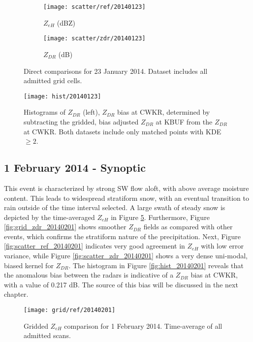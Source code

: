 \begin{figure}[H]
\centering
   \begin{subfigure}{0.49\linewidth} \centering
     \texttt{[image: scatter/ref/20140123]}
     \caption{$Z_{eH}$ (dBZ)}\label{fig:scatter_ref_20140123}
   \end{subfigure}
   \begin{subfigure}{0.49\linewidth} \centering
     \texttt{[image: scatter/zdr/20140123]}
     \caption{$Z_{DR}$ (dB)}\label{fig:scatter_zdr_20140123}
   \end{subfigure}
\caption{Direct comparisons for 23 January 2014. Dataset includes all admitted grid cells.}
\label{fig:scatter_20140123}
\end{figure}

\begin{figure}[H]
\texttt{[image: hist/20140123]}\centering
\caption{Histograms of $Z_{DR}$ (left), $Z_{DR}$ bias at CWKR, determined by subtracting the
gridded, bias adjusted $Z_{DR}$ at KBUF from the $Z_{DR}$ at CWKR. Both datasets include only
matched points with KDE $\geq 2$. } 
\label{fig:hist_20140123}
\end{figure}

\subsection{1 February 2014 - Synoptic}
This event is characterized by strong SW flow aloft, with above average moisture content. This leads to
widespread stratiform snow, with an eventual transition to rain outside of the time interval selected.
A large swath of steady snow is depicted by the time-averaged $Z_{eH}$ in Figure \ref{fig:grid_ref_20140201}. 
Furthermore, Figure \ref{fig:grid_zdr_20140201} shows smoother $Z_{DR}$
fields as compared with other events, which confirms the stratiform nature of the precipitation. Next, Figure \ref{fig:scatter_ref_20140201} indicates very
good agreement in $Z_{eH}$ with low error variance, while Figure \ref{fig:scatter_zdr_20140201} shows a very dense uni-modal, biased kernel for $Z_{DR}$. The
histogram in Figure \ref{fig:hist_20140201} reveals that the anomalous bias between the radars is indicative of a $Z_{DR}$ bias at CWKR, with a value of
0.217 dB. The source of this bias will be discussed in the next chapter.

\begin{figure}[H]
\texttt{[image: grid/ref/20140201]}
\caption{Gridded $Z_{eH}$ comparison for 1 February 2014. Time-average of all admitted scans.} 
\label{fig:grid_ref_20140201}
\end{figure}

